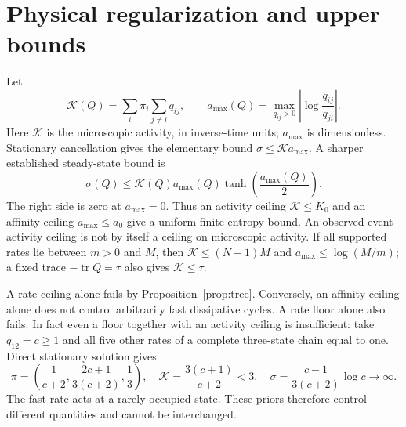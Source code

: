 \documentclass[aps,pre,onecolumn,11pt,longbibliography,notitlepage]{revtex4-2}
\newcommand{\1}{\mathbf 1}
\newcommand{\tr}{\operatorname{tr}}
\newcommand{\sig}{\sigma}
\begin{document}



\section{Physical regularization and upper bounds}\label{sec:regularization}
Let
\begin{equation}
 \mathcal K(Q)=\sum_i\pi_i\sum_{j\ne i}q_{ij},\qquad
 a_{\max}(Q)=\max_{q_{ij}>0}\left|\log\frac{q_{ij}}{q_{ji}}\right|.
\end{equation}
Here $\mathcal K$ is the microscopic activity, in inverse-time units;
$a_{\max}$ is dimensionless. Stationary cancellation gives the elementary
bound $\sig\le\mathcal K a_{\max}$. A sharper established steady-state
bound is~\cite{NishiyamaHasegawa2023}
\begin{equation}
 \sig(Q)\le\mathcal K(Q)a_{\max}(Q)
           \tanh\!\left(\frac{a_{\max}(Q)}2\right).\label{eq:sharpprior}
\end{equation}
The right side is zero at $a_{\max}=0$. Thus an activity ceiling
$\mathcal K\le K_0$ and an affinity ceiling $a_{\max}\le a_0$ give a
uniform finite entropy bound. An observed-event activity ceiling is not
by itself a ceiling on microscopic activity. If all supported rates lie
between $m>0$ and $M$, then
$\mathcal K\le(N-1)M$ and $a_{\max}\le\log(M/m)$; a fixed trace
$-\tr Q=\tau$ also gives $\mathcal K\le\tau$.

A rate ceiling alone fails by Proposition~\ref{prop:tree}. Conversely, an
affinity ceiling alone does not control arbitrarily fast dissipative
cycles. A rate floor alone also fails. In fact even a floor together with
an activity ceiling is insufficient: take $q_{12}=c\ge1$ and all five
other rates of a complete three-state chain equal to one. Direct
stationary solution gives
\begin{equation}
 \pi=\left(\frac1{c+2},\frac{2c+1}{3(c+2)},\frac13\right),\quad
 \mathcal K=\frac{3(c+1)}{c+2}<3,\quad
 \sig=\frac{c-1}{3(c+2)}\log c\longrightarrow\infty.
\end{equation}
The fast rate acts at a rarely occupied state. These priors therefore
control different quantities and cannot be interchanged.
\end{document}
